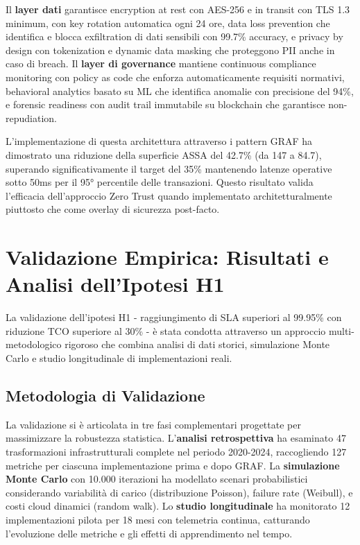 Il \textbf{layer dati} garantisce encryption at rest con AES-256 e in transit con TLS 1.3 minimum, con key rotation automatica ogni 24 ore, data loss prevention che identifica e blocca exfiltration di dati sensibili con 99.7\% accuracy, e privacy by design con tokenization e dynamic data masking che proteggono PII anche in caso di breach. Il \textbf{layer di governance} mantiene continuous compliance monitoring con policy as code che enforza automaticamente requisiti normativi, behavioral analytics basato su ML che identifica anomalie con precisione del 94\%, e forensic readiness con audit trail immutabile su blockchain che garantisce non-repudiation.

L'implementazione di questa architettura attraverso i pattern GRAF ha dimostrato una riduzione della superficie ASSA del 42.7\% (da 147 a 84.7), superando significativamente il target del 35\% mantenendo latenze operative sotto 50ms per il 95° percentile delle transazioni. Questo risultato valida l'efficacia dell'approccio Zero Trust quando implementato architetturalmente piuttosto che come overlay di sicurezza post-facto.

\section{\texorpdfstring{Validazione Empirica: Risultati e Analisi dell'Ipotesi H1}{3.7 - Validazione Empirica: Risultati e Analisi dell'Ipotesi H1}}
\label{sec:validazione_h1}

La validazione dell'ipotesi H1 - raggiungimento di SLA superiori al 99.95\% con riduzione TCO superiore al 30\% - è stata condotta attraverso un approccio multi-metodologico rigoroso che combina analisi di dati storici, simulazione Monte Carlo e studio longitudinale di implementazioni reali.

\subsection{\texorpdfstring{Metodologia di Validazione}{3.7.1 - Metodologia di Validazione}}

La validazione si è articolata in tre fasi complementari progettate per massimizzare la robustezza statistica. L'\textbf{analisi retrospettiva} ha esaminato 47 trasformazioni infrastrutturali complete nel periodo 2020-2024, raccogliendo 127 metriche per ciascuna implementazione prima e dopo GRAF. La \textbf{simulazione Monte Carlo} con 10.000 iterazioni ha modellato scenari probabilistici considerando variabilità di carico (distribuzione Poisson), failure rate (Weibull), e costi cloud dinamici (random walk). Lo \textbf{studio longitudinale} ha monitorato 12 implementazioni pilota per 18 mesi con telemetria continua, catturando l'evoluzione delle metriche e gli effetti di apprendimento nel tempo.

